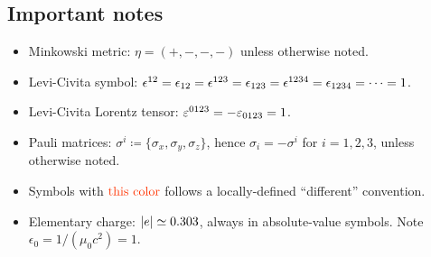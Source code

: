 \newcommand*\unc[2]{\substack{#1\\#2}}
\newcommand*\bound[2]{%
  \ifnum#1=68\stackrel{*}#2\else
  \ifnum#1=90\stackrel{\diamond}#2\else
  \ifnum#1=95\stackrel{*\!*}#2\else
  \ifnum#1=99\stackrel{\diamond\diamond}#2\else
  \ifnum#1=1\stackrel{*}#2\else
  \ifnum#1=2\stackrel{*\!*}#2\else
  \ifnum#1=3\stackrel{*\!*\!*}#2\else
  \ifnum#1<10\stackrel{#1\sigma}#2\else\stackrel{#1\%}#2\fi\fi\fi\fi\fi\fi\fi\fi
}
\newcommand\bounddescription{Confidence levels are shown by the marks $*$, $*\!*$, \mbox{$*\!\!*\!\!*$} (1--3$\sigma$), $\diamond$ (90\%), and $\diamond\diamond$ (99\%).}

\newcommand*\ech{\abs{e}}
\newcommand*\TWO{\mathbf{2}}
\newcommand*\THREE{\mathbf{3}}
\newcommand*\THREEbar{\overline{\mathbf{3}}}
\newcommand*\MSbar{\overline{\mathrm{MS}}\xspace}
\newcommand*\Nambu{\JAPANESE{南部}\xspace}
\newcommand*\Lubanski{Luba\'nski\xspace}


\setcounter{page}{0}
\nocite{PDG2018,PDG2020}
\begin{maketitle}
\vspace{20mm}
\subsection*{Important notes}
\begin{itemize}
 \item Minkowski metric: $\eta=(+,-,-,-)$ unless otherwise noted.
 \item Levi-Civita symbol: $\epsilon^{12}=\epsilon_{12}=\epsilon^{123}=\epsilon_{123}=\epsilon^{1234}=\epsilon_{1234}=\cdots=1$.
 \item Levi-Civita Lorentz tensor: $\varepsilon^{0123}=-\varepsilon_{0123}=1$.
 \item Pauli matrices: $\sigma^i\coloneq\{\sigma_x, \sigma_y, \sigma_z\}$,  hence $\sigma_i = -\sigma^i$ for $i=1,2,3$, unless otherwise noted.
 \item Symbols with $\C{\text{this color}}$ follows a locally-defined ``different'' convention.
 \item Elementary charge: $\ech\simeq0.303$, always in absolute-value symbols. Note $\epsilon_0=1/(\mu_0c^2)=1$.
\end{itemize}
\end{maketitle}


\clearpage

\clearpage

\clearpage

%
\clearpage

\clearpage

\clearpage

\clearpage

\clearpage

\clearpage

\clearpage

\clearpage

\clearpage
\appendix



